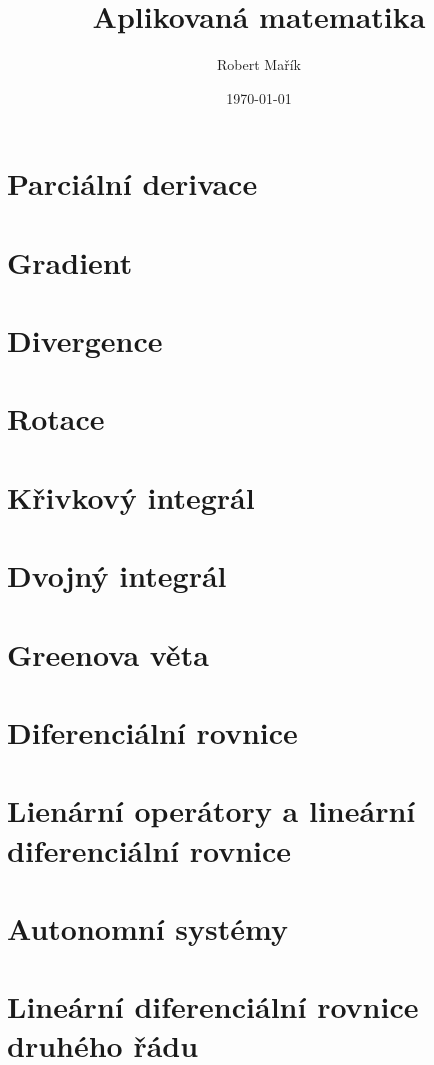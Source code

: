 \documentclass[twocolumn]{report}
\title{Aplikovaná matematika}
\author{Robert Mařík}
\date{\today}
\begin{document}
\maketitle



\tableofcontents

\chapter{Parciální derivace}


\chapter{Gradient}


\chapter{Divergence}


\chapter{Rotace}


\chapter{Křivkový integrál}


\chapter{Dvojný integrál}


\chapter{Greenova věta}


\chapter{Diferenciální rovnice}


\chapter{Lienární operátory a lineární diferenciální rovnice}
 

 \chapter{Autonomní systémy}
 

 \chapter{Lineární diferenciální rovnice druhého řádu}
 

% 
\end{document}
